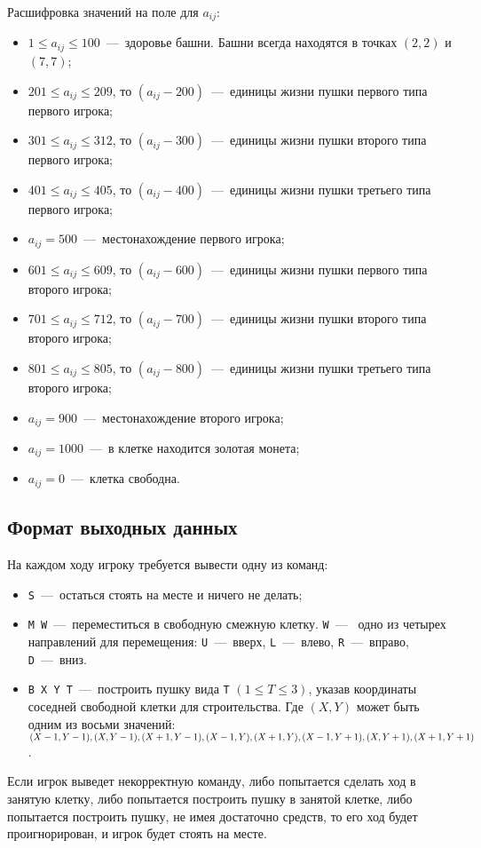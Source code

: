 \documentclass[14pt]{extarticle}
\begin{document}
Расшифровка значений на поле для $a_{ij}$:
\begin{itemize}
    \item $1 \leq a_{ij} \leq 100$~---~здоровье башни. Башни всегда находятся в точках $(2, 2)$ и $(7, 7)$;
    \item $201 \leq a_{ij} \leq 209$, то $(a_{ij} - 200)$~---~единицы жизни пушки первого типа первого игрока;
    \item $301 \leq a_{ij} \leq 312$, то $(a_{ij} - 300)$~---~единицы жизни пушки второго типа первого игрока;
    \item $401 \leq a_{ij} \leq 405$, то $(a_{ij} - 400)$~---~единицы жизни пушки третьего типа первого игрока;
    \item $a_{ij} = 500$~---~местонахождение первого игрока;
    \item $601 \leq a_{ij} \leq 609$, то $(a_{ij} - 600)$~---~единицы жизни пушки первого типа второго игрока;
    \item $701 \leq a_{ij} \leq 712$, то $(a_{ij} - 700)$~---~единицы жизни пушки второго типа второго игрока;
    \item $801 \leq a_{ij} \leq 805$, то $(a_{ij} - 800)$~---~единицы жизни пушки третьего типа второго игрока;
    \item $a_{ij} = 900$~---~местонахождение второго игрока;
    \item $a_{ij} = 1000$~---~в клетке находится золотая монета;
    \item $a_{ij} = 0$~---~клетка свободна.
\end{itemize}

\subsection*{Формат выходных данных}
На каждом ходу игроку требуется вывести одну из команд:
\begin{itemize}
    \item \texttt{S}~---~остаться стоять на месте и ничего не делать;
    \item \texttt{M W}~---~переместиться в свободную смежную клетку. \texttt{W}~---~ одно из четырех направлений для перемещения: \texttt{U}~---~вверх, \texttt{L}~---~влево, \texttt{R}~---~вправо, \texttt{D}~---~вниз.
    \item \texttt{B X Y T}~---~построить пушку вида \texttt{T} $(1 \leq T \leq 3)$, указав координаты соседней свободной клетки для строительства. Где $(X, Y)$ может быть одним из восьми значений: $(X - 1, Y - 1), (X, Y - 1), (X + 1, Y - 1), (X - 1, Y), \\ (X + 1, Y), (X - 1, Y + 1), (X, Y + 1), (X + 1, Y + 1)$.
\end{itemize}

Если игрок выведет некорректную команду, либо попытается сделать ход в занятую клетку, либо попытается построить пушку в занятой клетке, либо попытается построить пушку, не имея достаточно средств, то его ход будет проигнорирован, и игрок будет стоять на месте.
\end{document}
